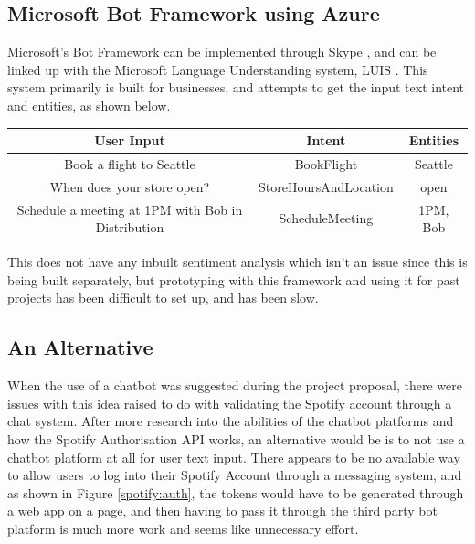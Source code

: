 \subsection{Microsoft Bot Framework using Azure}

Microsoft's Bot Framework can be implemented through Skype \cite{Azure}, and can be linked up with the Microsoft Language Understanding system, LUIS \cite{LUIS}. This system primarily is built for businesses, and attempts to get the input text intent and entities, as shown below.
\begin{center}
\begin{tabular}{ |c|c|c| } 
 \hline
  User Input & Intent & Entities \\ 
 \hline                        
 Book a flight to Seattle & BookFlight & Seattle \\
 When does your store open? & StoreHoursAndLocation & open \\
 Schedule a meeting at 1PM with Bob in Distribution & ScheduleMeeting & 1PM, Bob \\
 \hline
\end{tabular}
\end{center}

This does not have any inbuilt sentiment analysis which isn't an issue since this is being built separately, but prototyping with this framework and using it for past projects has been difficult to set up, and has been slow.

\subsection{An Alternative}

When the use of a chatbot was suggested during the project proposal, there were issues with this idea raised to do with validating the Spotify account through a chat system. 
After more research into the abilities of the chatbot platforms and how the Spotify Authorisation API works, an alternative would be is to not use a chatbot platform at all for user text input.
There appears to be no available way to allow users to log into their Spotify Account through a messaging system, and as shown in Figure \ref{spotify:auth}, the tokens would have to be generated through a web app on a page, and then having to pass it through the third party bot platform is much more work and seems like unnecessary effort. 

